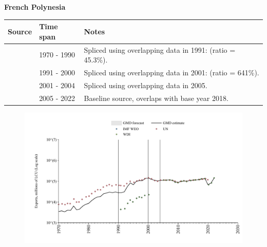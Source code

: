 \documentclass[12pt,a4paper,landscape]{article}
\begin{document}
\begin{adjustbox}{max totalsize={\paperwidth}{\paperheight},center}
\begin{minipage}[t][\textheight][t]{\textwidth}
\vspace*{0.5cm}
{}
\begin{center}
{\Large\bfseries French Polynesia}
\end{center}
\vspace{0.5cm}
\begin{table}[H]
\centering
\small
\begin{tabular}{|l|l|l|}
\hline
\textbf{Source} & \textbf{Time span} & \textbf{Notes} \\
\hline
\rowcolor{white}\cite{UN}& 1970 - 1990 &Spliced using overlapping data in 1991: (ratio = 45.3\%).\\
\rowcolor{lightgray}\cite{WDI}& 1991 - 2000 &Spliced using overlapping data in 2001: (ratio = 641\%).\\
\rowcolor{white}\cite{UN}& 2001 - 2004 &Spliced using overlapping data in 2005.\\
\rowcolor{lightgray}\cite{WDI}& 2005 - 2022 &Baseline source, overlaps with base year 2018.\\
\hline
\end{tabular}
\end{table}
\begin{figure}[H]
\centering
\includegraphics[width=\textwidth,height=0.6\textheight,keepaspectratio]{graphs/PYF_exports.pdf}
\end{figure}
\end{minipage}
\end{adjustbox}
\end{document}
